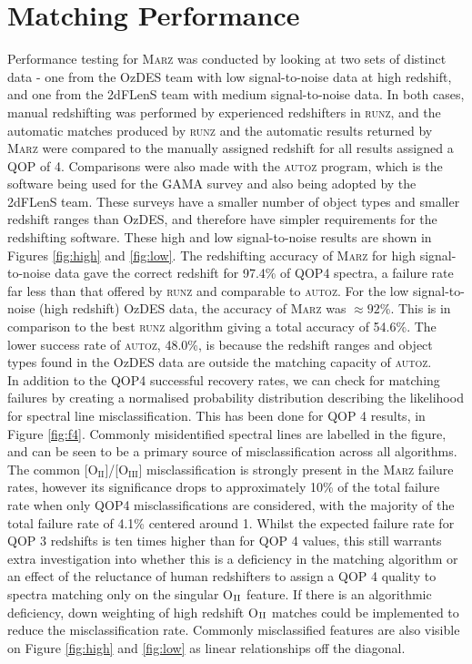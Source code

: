 \documentclass[iop]{emulateapj}
\newcommand{\runz}{\textsc{runz}}
\newcommand{\autoz}{\textsc{autoz}}
\newcommand{\marz}{\textsc{Marz}}
\begin{document}
\section{Matching Performance}

Performance testing for \marz{} was conducted by looking at two sets of distinct data - one from the OzDES team with low signal-to-noise data at high redshift, and one from the 2dFLenS team with medium signal-to-noise data. In both cases, manual redshifting was performed by experienced redshifters in \runz{}, and the automatic matches produced by \runz{} and the automatic results returned by \marz{} were compared to the manually assigned redshift for all results assigned a QOP of 4. Comparisons were also made with the \autoz{} program, which is the software being used for the GAMA survey and also being adopted by the 2dFLenS team. These surveys have a smaller number of object types and smaller redshift ranges than OzDES, and therefore have simpler requirements for the redshifting software. These high and low signal-to-noise results are shown in Figures \ref{fig:high} and \ref{fig:low}. The redshifting accuracy of \marz{} for high signal-to-noise data gave the correct redshift for 97.4\% of QOP4 spectra, a failure rate far less than that offered by \runz{} and comparable to \autoz{}. For the low signal-to-noise (high redshift) OzDES data, the accuracy of \marz{} was $\approx 92$\%. This is in comparison to the best \runz{} algorithm giving a total accuracy of 54.6\%. The lower success rate of \autoz, 48.0\%, is because the redshift ranges and object types found in the OzDES data are outside the matching capacity of \autoz{}.\\

In addition to the QOP4 successful recovery rates, we can check for matching failures by creating a normalised probability distribution describing the likelihood for spectral line misclassification. This has been done for QOP 4 results, in Figure \ref{fig:f4}. Commonly misidentified spectral lines are labelled in the figure, and can be seen to be a primary source of misclassification across all algorithms. The common [O$_{\mathrm{II}}$]/[O$_{\mathrm{III}}$] misclassification is strongly present in the \marz{} failure rates, however its significance drops to approximately 10\% of the total failure rate when only QOP4 misclassifications are considered, with the majority of the total failure rate of 4.1\% centered around 1. Whilst the expected failure rate for QOP 3 redshifts is ten times higher than for QOP 4 values, this still warrants extra investigation into whether this is a deficiency in the matching algorithm or an effect of the reluctance of human redshifters to assign a QOP 4 quality to spectra matching only on the singular O$_{\rm{II}}$ feature. If there is an algorithmic deficiency, down weighting of high redshift O$_{\rm{II}}$ matches could be implemented to reduce the misclassification rate. Commonly misclassified features are also visible on Figure \ref{fig:high} and \ref{fig:low} as linear relationships off the diagonal.\\
\end{document}
